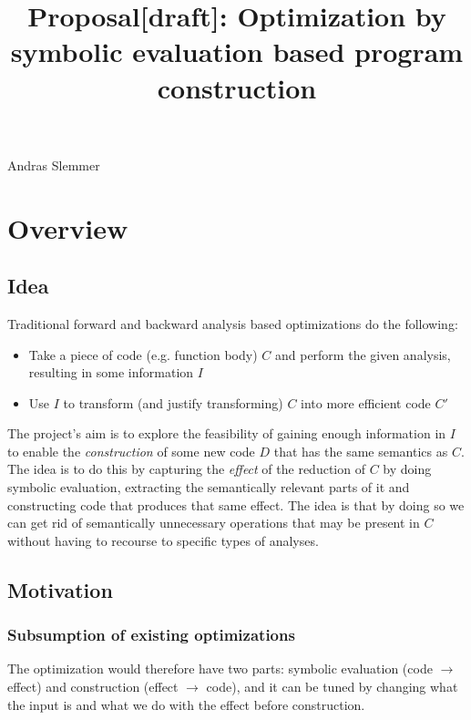 \documentclass[a4paper]{article}
\begin{document}
\title{Proposal[draft]: Optimization by symbolic evaluation based program construction }
\maketitle
\centerline{
  Andras Slemmer
}

\section{Overview}

\subsection{Idea}

Traditional forward and backward analysis based optimizations do the following:

\begin{itemize}

\item Take a piece of code (e.g. function body) $C$ and perform the given analysis, resulting in some information $I$

\item Use $I$ to transform (and justify transforming) $C$ into more efficient code $C'$

\end{itemize}

The project's aim is to explore the feasibility of gaining enough information in $I$ to enable the \emph{construction} of some new code $D$ that has the same semantics as $C$. The idea is to do this by capturing the \emph{effect} of the reduction of $C$ by doing symbolic evaluation, extracting the semantically relevant parts of it and constructing code that produces that same effect. The idea is that by doing so we can get rid of semantically unnecessary operations that may be present in $C$ without having to recourse to specific types of analyses.

\subsection{Motivation}

\subsubsection*{Subsumption of existing optimizations}

The optimization would therefore have two parts: symbolic evaluation (code $\to$ effect) and construction (effect $\to$ code), and it can be tuned by changing what the input is and what we do with the effect before construction.
\end{document}
